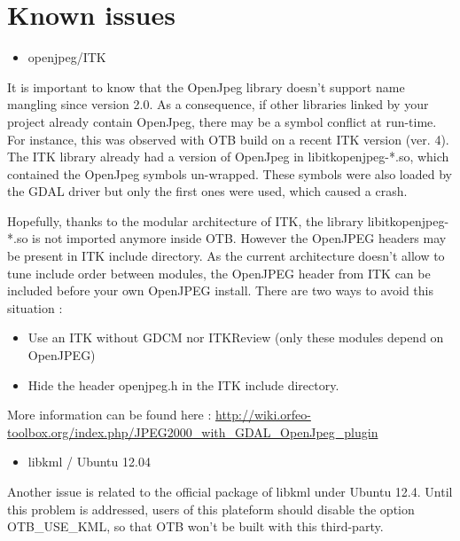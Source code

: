 \section{Known issues}
\label{sec:knownissues}

\begin{itemize}
\item  openjpeg/ITK 
\end{itemize}

It is important to know that the OpenJpeg library doesn't support name mangling since version 2.0. 
As a consequence, if other libraries linked by your project already contain OpenJpeg, there may be a symbol conflict at run-time. 
For instance, this was observed with OTB build on a recent ITK version (ver. 4). 
The ITK library already had a version of OpenJpeg in libitkopenjpeg-*.so, which contained the OpenJpeg symbols un-wrapped.
These symbols were also loaded by the GDAL driver but only the first ones were used, which caused a crash. 

Hopefully, thanks to the modular architecture of ITK, the library libitkopenjpeg-*.so is not imported anymore inside OTB.
However the OpenJPEG headers may be present in ITK include directory. As the current architecture doesn't allow to tune 
include order between modules, the OpenJPEG header from ITK can be included before your own OpenJPEG install. There are
two ways to avoid this situation :
\begin{itemize}
\item Use an ITK without GDCM nor ITKReview (only these modules depend on OpenJPEG)
\item Hide the header openjpeg.h in the ITK include directory.
\end{itemize}

More information can be found here : \url{http://wiki.orfeo-toolbox.org/index.php/JPEG2000_with_GDAL_OpenJpeg_plugin}

\begin{itemize}
\item  libkml / Ubuntu 12.04 
\end{itemize}

Another issue is related to the official package of libkml under Ubuntu 12.4.
Until this problem is addressed, users of this plateform should disable the option OTB\_USE\_KML, so that OTB won't be built with this third-party.

